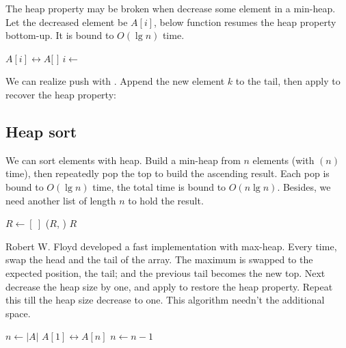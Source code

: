 \documentclass[b5paper]{article}
\begin{document}
The heap property may be broken when decrease some element in a min-heap. Let the decreased element be $A[i]$, below function resumes the heap property bottom-up. It is bound to $O(\lg n)$ time.

\begin{algorithmic}[1]
    \State {} $A[i] \leftrightarrow A[$  $]$
    \State $i \gets$  
  \EndWhile
\EndFunction
\end{algorithmic}

 

We can realize push with  \cite{CLRS}. Append the new element $k$ to the tail, then apply  to recover the heap property:

\begin{algorithmic}[1]
  \State {}
  \State {}
\EndFunction
\end{algorithmic}

\subsection{Heap sort}
\label{heap-sort} 

We can sort elements with heap. Build a min-heap from $n$ elements (with $(n)$ time), then repeatedly pop the top to build the ascending result. Each pop is bound to $O(\lg n)$ time, the total time is bound to $O(n \lg n)$. Besides, we need another list of length $n$ to hold the result.

\begin{algorithmic}[1]
  \State $R \gets [\ ]$
  \State {}
    \State {}($R$, )
  \EndWhile
  \State \Return $R$
\EndFunction
\end{algorithmic}

Robert W. Floyd developed a fast implementation with max-heap. Every time, swap the head and the tail of the array. The maximum is swapped to the expected position, the tail; and the previous tail becomes the new top. Next decrease the heap size by one, and apply  to restore the heap property. Repeat this till the heap size decrease to one. This algorithm needn't the additional space.

\begin{algorithmic}[1]
  \State {}
  \State $n \gets |A|$
    \State {} $A[1] \leftrightarrow A[n]$
    \State $n \gets n - 1$
    \State {}
  \EndWhile
\EndFunction
\end{algorithmic}
\end{document}
